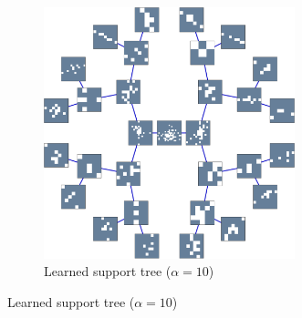\begin{figure}[!ht]
\begin{subfigure}[b]{0.49\textwidth}
\includegraphics[width=0.8\textwidth]{figures/tree-unbalanced-supp/xp_learnsupp256_curvelet_decomp3[tree-binary_dpth4]_supp-diracs_[usegrad1_every5_add5_totinit0_totadd279_alpha10]_tree.pdf}
\caption{Learned support tree ($\alpha=10$)}\label{fig_test_omppalmtree2-tree_alpha10}
\end{subfigure}
\end{figure}
